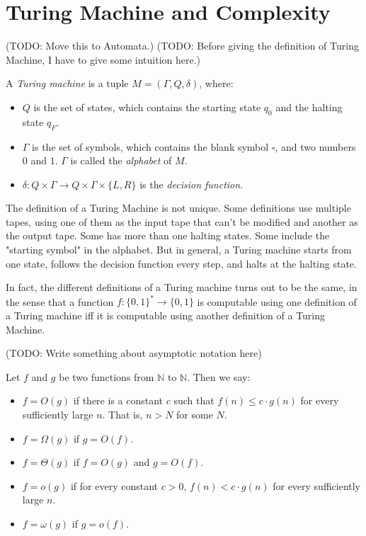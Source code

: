 
\newcommand{\zo}{\{0,1\}}
\newcommand{\strs}{\{0,1\}^\ast}


    \section{Turing Machine and Complexity}
        (TODO: Move this to Automata.) (TODO: Before giving the definition of Turing Machine, I have to give some intuition here.)
        \begin{defn} \label{def_tm}
            A \emph{Turing machine} is a tuple $M=(\Gamma,Q,\delta)$, where: \begin{itemize}
                \item $Q$ is the set of states, which contains the starting state $q_0$ and the halting state $q_F$.
                \item $\Gamma$ is the set of symbols, which contains the blank symbol $\square$, and two numbers $0$ and $1$. $\Gamma$ is called the \emph{alphabet} of $M$.
                \item $\delta:Q \times \Gamma \rightarrow Q \times \Gamma \times \{L,R\}$ is the \emph{decision function}.
            \end{itemize}
        \end{defn}
        
        The definition of a Turing Machine is not unique. Some definitions use multiple tapes, using one of them as the input tape that can't be modified and another as the output tape. Some has more than one halting states. Some include the "starting symbol" in the alphabet. But in general, a Turing machine starts from one state, follows the decision function every step, and halts at the halting state.
        
        In fact, the different definitions of a Turing machine turns out to be the same, in the sense that a function $f:\strs \rightarrow \zo$ is computable using one definition of a Turing machine iff it is computable using another definition of a Turing Machine.
        
        (TODO: Write something about asymptotic notation here)
        
        \begin{defn} \label{def_bigo}
            Let $f$ and $g$ be two functions from $\mathbb{N}$ to $\mathbb{N}$. Then we say: \begin{itemize}
                \item $f=O(g)$ if there is a constant $c$ such that $f(n) \leq c \cdot g(n)$ for every sufficiently large $n$. That is, $n>N$ for some $N$.
                \item $f=\Omega(g)$ if $g=O(f)$.
                \item $f=\Theta(g)$ if $f=O(g)$ and $g=O(f)$.
                \item $f=o(g)$ if for every constant $c>0$, $f(n) < c \cdot g(n)$ for every sufficiently large $n$.
                \item $f=\omega(g)$ if $g=o(f)$.
            \end{itemize} 
        \end{defn}
        
